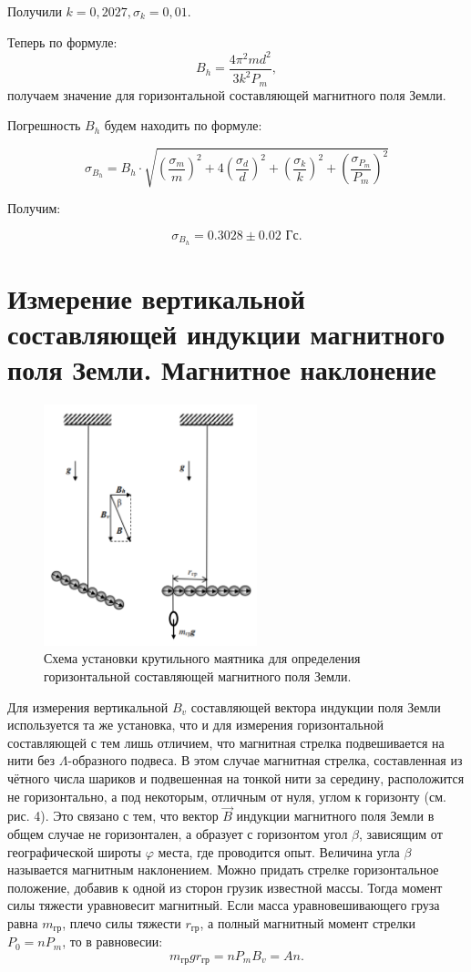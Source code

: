 \documentclass[a4paper, 14pt]{extarticle}%
\newcommand\ECaption[1]{%
     \captionsetup{font=footnotesize}%
     \caption{#1}}
\begin{document}
Получили $k = 0,2027, \sigma_k = 0,01$.

Теперь по формуле:
\[B_h = \dfrac{4\pi^2md^2}{3k^2P_m},\]
получаем значение для горизонтальной составляющей магнитного поля Земли.

Погрешность $B_h$ будем находить по формуле:

\begin{equation}
\sigma_{B_h} = B_h\cdot\sqrt{ (\frac{\sigma_m}{m})^2  +  4(\frac{\sigma_d}{d})^2  +  (\frac{\sigma_k}{k})^2  +  (\frac{\sigma_{P_m}}{P_m})^2 }
\end{equation}

Получим:

\[\sigma_{B_h} = 0.3028\pm 0.02 \text{ Гс}.\]


\newpage

\section{Измерение вертикальной составляющей
индукции магнитного поля Земли.
Магнитное наклонение}

\begin{figure}
\begin{center}
\includegraphics[height=7cm]{pics/vert.png}
\end{center}
\ECaption{Схема установки крутильного маятника для определения горизонтальной составляющей магнитного поля Земли.}
\end{figure}

Для измерения вертикальной $B_v$ составляющей вектора индукции поля Земли используется
та же установка, что и для измерения горизонтальной составляющей с тем лишь отличием,
что магнитная стрелка подвешивается на нити
без $\Lambda$-образного подвеса. В этом случае магнитная стрелка, составленная из чётного числа
шариков и подвешенная на тонкой нити за середину, расположится не горизонтально, а под некоторым, отличным от нуля, углом к горизонту
(см. рис. 4). Это связано с тем, что вектор $\vec{B}$
индукции магнитного поля Земли в общем случае не горизонтален, а образует с горизонтом
угол $\beta$, зависящим от географической широты $\varphi$
места, где проводится опыт. Величина угла $\beta$
называется магнитным наклонением. Можно придать стрелке горизонтальное положение, добавив к одной из сторон грузик известной массы. Тогда момент силы тяжести уравновесит магнитный.
Если масса уравновешивающего
груза равна $m_{\text{гр}}$, плечо силы тяжести $r_{\text{гр}}$, а полный магнитный момент стрелки $P_0 = nP_m$, то
в равновесии: 
\[m_{\text{гр}}gr_{\text{гр}} = nP_mB_v = An.\]
\end{document}
